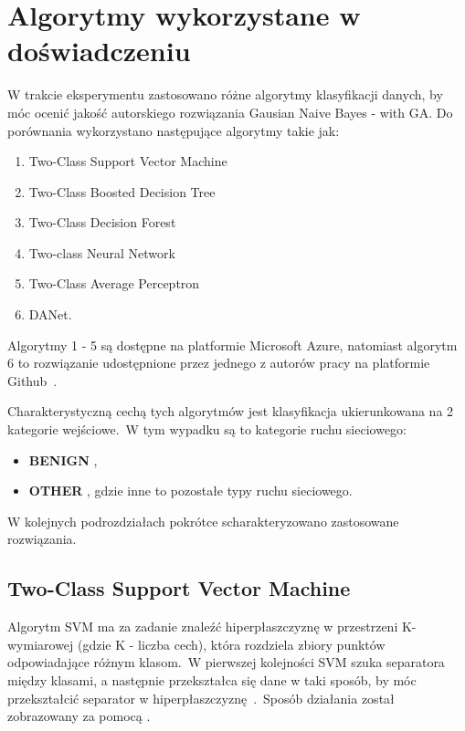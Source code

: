 \section{Algorytmy wykorzystane w doświadczeniu}
\label{sec:alg}
W trakcie eksperymentu zastosowano różne algorytmy klasyfikacji danych, by móc ocenić jakość autorskiego rozwiązania Gausian Naive Bayes - with GA. Do porównania wykorzystano następujące algorytmy takie jak:
\begin{enumerate}
    \item Two-Class Support Vector Machine
    \item Two-Class Boosted Decision Tree
    \item Two-Class Decision Forest
    \item Two-class Neural Network
    \item Two-Class Average Perceptron
    \item DANet.
\end{enumerate}
Algorytmy 1 - 5 są dostępne na platformie Microsoft Azure, natomiast algorytm 6 to rozwiązanie udostępnione przez jednego z autorów pracy na platformie Github~\cite{Danet}.

Charakterystyczną cechą tych algorytmów jest klasyfikacja ukierunkowana na 2 kategorie wejściowe.\ W tym wypadku są to kategorie ruchu sieciowego:
\begin{itemize}
    \item \textbf{BENIGN} ,
    \item \textbf{OTHER} , gdzie inne to pozostałe typy ruchu sieciowego.
\end{itemize}

W kolejnych podrozdziałach pokrótce scharakteryzowano zastosowane rozwiązania.

\subsection{Two-Class Support Vector Machine}\label{subsec:svm}
Algorytm SVM ma za zadanie znaleźć hiperpłaszczyznę w przestrzeni K-wymiarowej (gdzie K - liczba cech), która rozdziela zbiory punktów odpowiadające różnym klasom.\ W pierwszej kolejności SVM szuka separatora między klasami, a następnie przekształca się dane w taki sposób, by móc przekształcić separator w hiperpłaszczyznę~\cite{IBM}.\ Sposób działania został zobrazowany za pomocą .

